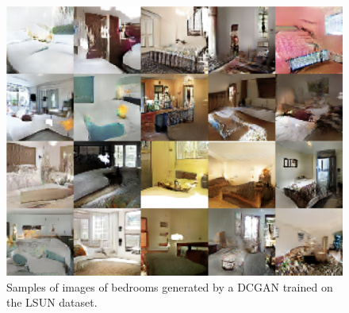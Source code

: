 \begin{figure}
  \centering
  \includegraphics[width=\figwidth]{dcgan_lsun}
  \caption{Samples of images of bedrooms generated by a DCGAN trained on the LSUN dataset.}
  \label{fig:dcgan_lsun}
\end{figure}

